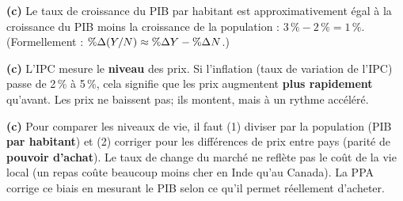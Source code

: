 
\begin{reponse}
\textbf{(c)} Le taux de croissance du PIB par habitant est approximativement égal à la croissance du PIB moins la croissance de la population : $3\,\% - 2\,\% = 1\,\%$. (Formellement : $\%\Delta (Y/N) \approx \%\Delta Y - \%\Delta N$.)
\end{reponse}


\begin{reponse}
\textbf{(c)} L'IPC mesure le \textbf{niveau} des prix. Si l'inflation (taux de variation de l'IPC) passe de 2\,\% à 5\,\%, cela signifie que les prix augmentent \textbf{plus rapidement} qu'avant. Les prix ne baissent pas; ils montent, mais à un rythme accéléré.
\end{reponse}


\begin{reponse}
\textbf{(c)} Pour comparer les niveaux de vie, il faut (1) diviser par la population (PIB \textbf{par habitant}) et (2) corriger pour les différences de prix entre pays (parité de \textbf{pouvoir d'achat}). Le taux de change du marché ne reflète pas le coût de la vie local (un repas coûte beaucoup moins cher en Inde qu'au Canada). La PPA corrige ce biais en mesurant le PIB selon ce qu'il permet réellement d'acheter.
\end{reponse}

